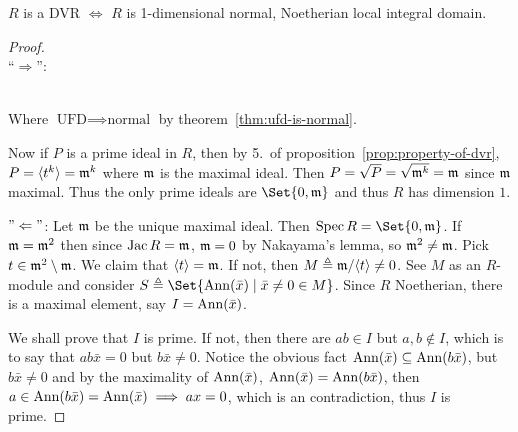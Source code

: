 \begin{prop} \label{dvr-equiv-condition}
  $R$ is a DVR $\iff$ $R$ is 1-dimensional normal, Noetherian local integral domain.
  \begin{proof} \hfill \\
    ``$\Rightarrow$'':
     \\
    Where $\text{UFD} \implies \text{normal}$ by theorem~\ref{thm:ufd-is-normal}.

    Now if $P$ is a prime ideal in $R$, then by 5.\ of proposition~\ref{prop:property-of-dvr},
    $P = \langle t^k\rangle = \mathfrak{m}^k$ where $\mathfrak{m}$ is the maximal ideal.
    Then $P = \sqrt{P} = \sqrt{\mathfrak{m}^k} = \mathfrak{m}$ since $\mathfrak{m}$ maximal. Thus the only
    prime ideals are $\Set{0, \mf}$ and thus $R$ has dimension $1$.

    $"\Leftarrow"$: Let $\mathfrak{m}$ be the unique maximal ideal.
    Then $\Spec R = \Set{0, \mf}$.
    If $\mathfrak{m} = \mathfrak{m}^2$ then since $\operatorname{Jac} R = \mathfrak{m}$, $\mathfrak{m} = 0$ by Nakayama's lemma,
    so $\mathfrak{m}^2 \neq \mathfrak{m}$. Pick $t \in \mathfrak{m}^2 \setminus \mathfrak{m}$.
    We claim that $\langle t\rangle = \mathfrak{m}$. If not, then $M \triangleq \mathfrak{m} / \langle t\rangle \neq 0$.
    See $M$ as an $R$-module and consider $S \triangleq \Set{ \Ann(\bar{x}) \mid \bar{x} \neq 0 \in M }$.
    Since $R$ Noetherian, there is a maximal element, say $I = \operatorname{Ann}(\bar{x})$.

    We shall prove that $I$ is prime. If not, then there are $ab \in I$
    but $a, b \not\in I$, which is to say that $ab\bar{x} = 0$ but $b \bar{x} \neq 0$.
    Notice the obvious fact $\operatorname{Ann}(\bar{x}) \subseteq \operatorname{Ann}(b\bar{x})$,
    but $b \bar{x} \ne 0$ and by the maximality of $\operatorname{Ann}(\bar{x})$,
    $\operatorname{Ann}(\bar{x}) = \operatorname{Ann}(b\bar{x})$, then $a \in \operatorname{Ann}(b\bar{x}) = \operatorname{Ann}(\bar{x})
    \implies ax = 0$, which is an contradiction, thus $I$ is prime.


\end{proof}
\end{prop}
